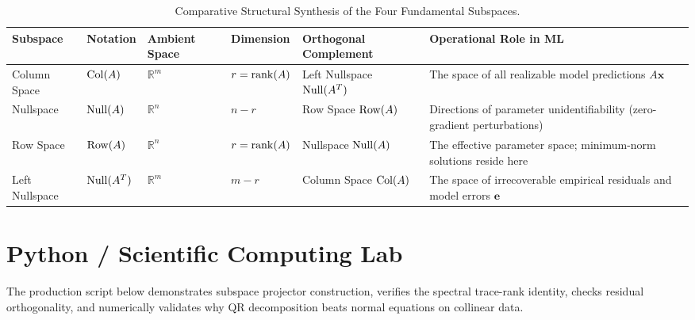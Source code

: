 \begin{table}[htbp]
\centering
\small
\begin{tabularx}{\textwidth}{lXXXXX}
\toprule
\textbf{Subspace} & \textbf{Notation} & \textbf{Ambient Space} & \textbf{Dimension} & \textbf{Orthogonal Complement} & \textbf{Operational Role in ML} \\
\midrule
Column Space & $\operatorname{Col}(A)$ & $\mathbb{R}^m$ & $r = \operatorname{rank}(A)$ & Left Nullspace $\operatorname{Null}(A^T)$ & The space of all realizable model predictions $A\mathbf{x}$ \\
\addlinespace
Nullspace & $\operatorname{Null}(A)$ & $\mathbb{R}^n$ & $n - r$ & Row Space $\operatorname{Row}(A)$ & Directions of parameter unidentifiability (zero-gradient perturbations) \\
\addlinespace
Row Space & $\operatorname{Row}(A)$ & $\mathbb{R}^n$ & $r = \operatorname{rank}(A)$ & Nullspace $\operatorname{Null}(A)$ & The effective parameter space; minimum-norm solutions reside here \\
\addlinespace
Left Nullspace & $\operatorname{Null}(A^T)$ & $\mathbb{R}^m$ & $m - r$ & Column Space $\operatorname{Col}(A)$ & The space of irrecoverable empirical residuals and model errors $\mathbf{e}$ \\
\bottomrule
\end{tabularx}
\caption{Comparative Structural Synthesis of the Four Fundamental Subspaces.}
\label{tab:subspaces_synthesis}
\end{table}

\section{Python / Scientific Computing Lab}

The production script below demonstrates subspace projector construction, verifies the spectral trace-rank identity, checks residual orthogonality, and numerically validates why QR decomposition beats normal equations on collinear data.

